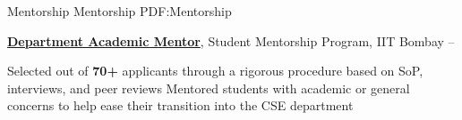 \Section
{Mentorship}
{Mentorship}
{PDF:Mentorship}

\Entry
\href{https://csedamp.wordpress.com}
{\textbf{Department Academic Mentor}},
Student Mentorship Program, IIT Bombay
\hfill
{} --
\Gap
\begin{Detail}
\SubBulletItem
Selected out of {\bf 70+} applicants through a rigorous procedure based on SoP, interviews, and peer reviews
\SubBulletItem
Mentored students with academic or general concerns to help ease their transition into the CSE department
\end{Detail}